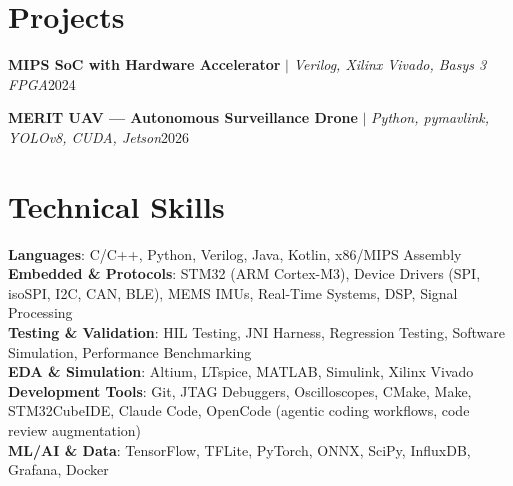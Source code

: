 \documentclass[letterpaper,11pt]{article}
\begin{document}
\section{Projects}
    \resumeSubHeadingListStart
 
      \resumeProjectHeading
          {\textbf{MIPS SoC with Hardware Accelerator} $|$ \emph{Verilog, Xilinx Vivado, Basys 3 FPGA}}{2024}
          \resumeItemListStart
            
          \resumeItemListEnd
 
      \resumeProjectHeading
          {\textbf{MERIT UAV --- Autonomous Surveillance Drone} $|$ \emph{Python, pymavlink, YOLOv8, CUDA, Jetson}}{2026}
          \resumeItemListStart

            
          \resumeItemListEnd 
 
    \resumeSubHeadingListEnd
 
\section{Technical Skills}
 \resumeSubHeadingListStart
    \small{\item{
     \textbf{Languages}{: C/C++, Python, Verilog, Java, Kotlin, x86/MIPS Assembly} \\
     \textbf{Embedded \& Protocols}{: STM32 (ARM Cortex-M3), Device Drivers (SPI, isoSPI, I2C, CAN, BLE), MEMS IMUs, Real-Time Systems, DSP, Signal Processing} \\
     \textbf{Testing \& Validation}{: HIL Testing, JNI Harness, Regression Testing, Software Simulation, Performance Benchmarking} \\
     \textbf{EDA \& Simulation}{: Altium, LTspice, MATLAB, Simulink, Xilinx Vivado} \\
     \textbf{Development Tools}{: Git, JTAG Debuggers, Oscilloscopes, CMake, Make, STM32CubeIDE, Claude Code, OpenCode (agentic coding workflows, code review augmentation)} \\
     \textbf{ML/AI \& Data}{: TensorFlow, TFLite, PyTorch, ONNX, SciPy, InfluxDB, Grafana, Docker}
    }}
 \resumeSubHeadingListEnd
 
\end{document}
